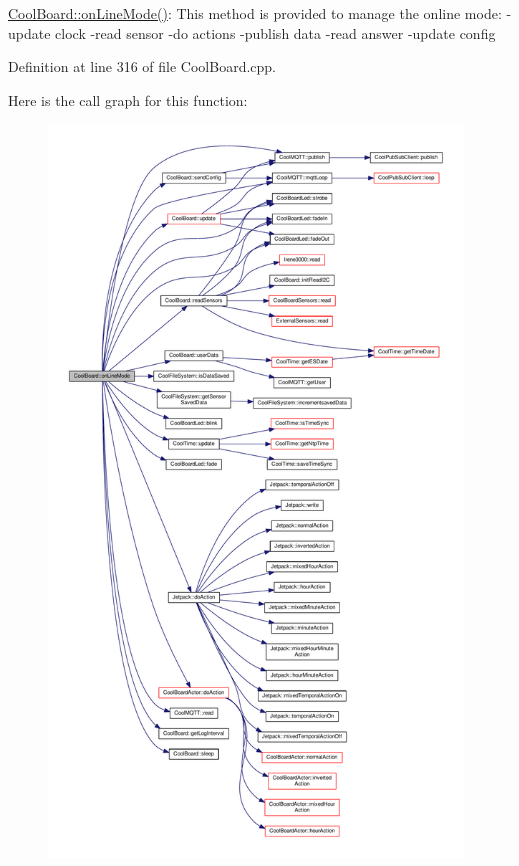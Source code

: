 \hyperlink{class_cool_board_aa0bbc4bc605e35618d18e68795c61363}{Cool\+Board\+::on\+Line\+Mode()}\+: This method is provided to manage the online mode\+: -\/update clock -\/read sensor -\/do actions -\/publish data -\/read answer -\/update config 

Definition at line 316 of file Cool\+Board.\+cpp.

Here is the call graph for this function\+:
\nopagebreak
\begin{figure}[H]
\begin{center}
\leavevmode
\includegraphics[height=550pt]{class_cool_board_aa0bbc4bc605e35618d18e68795c61363_cgraph}
\end{center}
\end{figure}
\mbox{\label{class_cool_board_a486507b8f0981d3cc671ed31c2145755}} 
